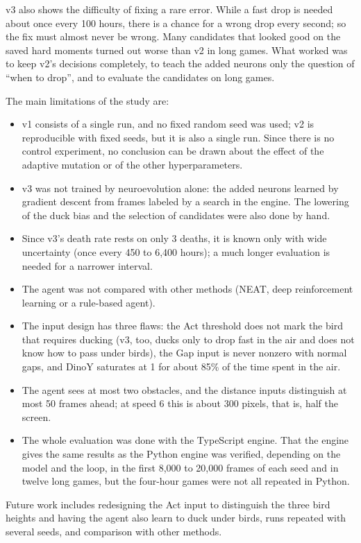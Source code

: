 \documentclass[11pt,a4paper]{article}
\begin{document}
v3 also shows the difficulty of fixing a rare error. While a fast drop is needed about once every 100 hours, there is a chance for a wrong drop every second; so the fix must almost never be wrong. Many candidates that looked good on the saved hard moments turned out worse than v2 in long games. What worked was to keep v2's decisions completely, to teach the added neurons only the question of ``when to drop'', and to evaluate the candidates on long games.

The main limitations of the study are:
\begin{itemize}
  \item v1 consists of a single run, and no fixed random seed was used; v2 is reproducible with fixed seeds, but it is also a single run. Since there is no control experiment, no conclusion can be drawn about the effect of the adaptive mutation or of the other hyperparameters.
  \item v3 was not trained by neuroevolution alone: the added neurons learned by gradient descent from frames labeled by a search in the engine. The lowering of the duck bias and the selection of candidates were also done by hand.
  \item Since v3's death rate rests on only 3 deaths, it is known only with wide uncertainty (once every 450 to 6,400 hours); a much longer evaluation is needed for a narrower interval.
  \item The agent was not compared with other methods (NEAT, deep reinforcement learning or a rule-based agent).
  \item The input design has three flaws: the Act threshold does not mark the bird that requires ducking (v3, too, ducks only to drop fast in the air and does not know how to pass under birds), the Gap input is never nonzero with normal gaps, and DinoY saturates at 1 for about 85\% of the time spent in the air.
  \item The agent sees at most two obstacles, and the distance inputs distinguish at most 50 frames ahead; at speed 6 this is about 300 pixels, that is, half the screen.
  \item The whole evaluation was done with the TypeScript engine. That the engine gives the same results as the Python engine was verified, depending on the model and the loop, in the first 8,000 to 20,000 frames of each seed and in twelve long games, but the four-hour games were not all repeated in Python.
\end{itemize}

Future work includes redesigning the Act input to distinguish the three bird heights and having the agent also learn to duck under birds, runs repeated with several seeds, and comparison with other methods.
\end{document}
